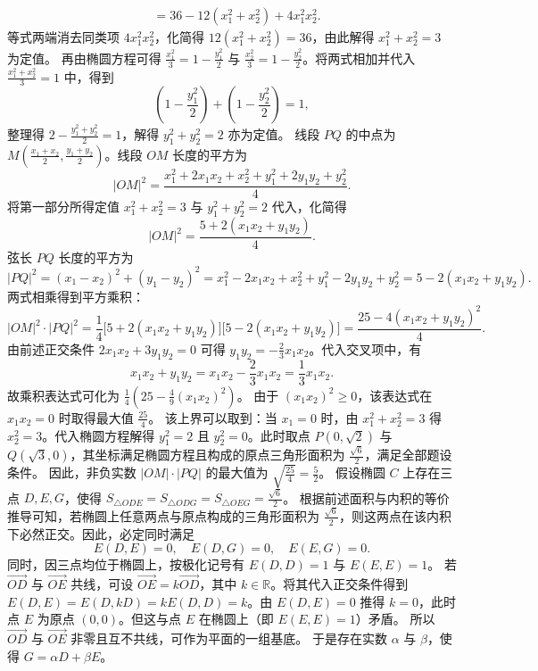 \begin{solution}
\begin{align*}
&= 36 - 12(x_1^2 + x_2^2) + 4x_1^2 x_2^2.
\end{align*}
等式两端消去同类项 $4x_1^2 x_2^2$，化简得 $12(x_1^2 + x_2^2) = 36$，由此解得 $x_1^2 + x_2^2 = 3$ 为定值。
再由椭圆方程可得 $\frac{x_1^2}{3} = 1 - \frac{y_1^2}{2}$ 与 $\frac{x_2^2}{3} = 1 - \frac{y_2^2}{2}$。将两式相加并代入 $\frac{x_1^2 + x_2^2}{3} = 1$ 中，得到
\[
\left( 1 - \frac{y_1^2}{2} \right) + \left( 1 - \frac{y_2^2}{2} \right) = 1,
\]
整理得 $2 - \frac{y_1^2 + y_2^2}{2} = 1$，解得 $y_1^2 + y_2^2 = 2$ 亦为定值。
线段 $PQ$ 的中点为 $M\left(\frac{x_1+x_2}{2}, \frac{y_1+y_2}{2}\right)$。线段 $OM$ 长度的平方为
\[
|OM|^2 = \frac{x_1^2 + 2x_1 x_2 + x_2^2 + y_1^2 + 2y_1 y_2 + y_2^2}{4}.
\]
将第一部分所得定值 $x_1^2 + x_2^2 = 3$ 与 $y_1^2 + y_2^2 = 2$ 代入，化简得
\[
|OM|^2 = \frac{5 + 2(x_1 x_2 + y_1 y_2)}{4}.
\]
弦长 $PQ$ 长度的平方为
\[
|PQ|^2 = (x_1 - x_2)^2 + (y_1 - y_2)^2 = x_1^2 - 2x_1 x_2 + x_2^2 + y_1^2 - 2y_1 y_2 + y_2^2 = 5 - 2(x_1 x_2 + y_1 y_2).
\]
两式相乘得到平方乘积：
\[
|OM|^2 \cdot |PQ|^2 = \frac{1}{4} \big[5 + 2(x_1 x_2 + y_1 y_2)\big] \big[5 - 2(x_1 x_2 + y_1 y_2)\big] = \frac{25 - 4(x_1 x_2 + y_1 y_2)^2}{4}.
\]
由前述正交条件 $2x_1 x_2 + 3y_1 y_2 = 0$ 可得 $y_1 y_2 = -\frac{2}{3} x_1 x_2$。代入交叉项中，有
\[
x_1 x_2 + y_1 y_2 = x_1 x_2 - \frac{2}{3} x_1 x_2 = \frac{1}{3} x_1 x_2.
\]
故乘积表达式可化为 $\frac{1}{4} \left( 25 - \frac{4}{9} (x_1 x_2)^2 \right)$。
由于 $(x_1 x_2)^2 \ge 0$，该表达式在 $x_1 x_2 = 0$ 时取得最大值 $\frac{25}{4}$。
该上界可以取到：当 $x_1 = 0$ 时，由 $x_1^2 + x_2^2 = 3$ 得 $x_2^2 = 3$。代入椭圆方程解得 $y_1^2 = 2$ 且 $y_2^2 = 0$。此时取点 $P(0, \sqrt{2})$ 与 $Q(\sqrt{3}, 0)$，其坐标满足椭圆方程且构成的原点三角形面积为 $\frac{\sqrt{6}}{2}$，满足全部题设条件。
因此，非负实数 $|OM| \cdot |PQ|$ 的最大值为 $\sqrt{\frac{25}{4}} = \frac{5}{2}$。
假设椭圆 $C$ 上存在三点 $D, E, G$，使得 $S_{\triangle ODE} = S_{\triangle ODG} = S_{\triangle OEG} = \frac{\sqrt{6}}{2}$。
根据前述面积与内积的等价推导可知，若椭圆上任意两点与原点构成的三角形面积为 $\frac{\sqrt{6}}{2}$，则这两点在该内积下必然正交。因此，必定同时满足
\[
E(D,E) = 0, \quad E(D,G) = 0, \quad E(E,G) = 0.
\]
同时，因三点均位于椭圆上，按极化记号有 $E(D,D) = 1$ 与 $E(E,E) = 1$。
若 $\overrightarrow{OD}$ 与 $\overrightarrow{OE}$ 共线，可设 $\overrightarrow{OE} = k\overrightarrow{OD}$，其中 $k \in \mathbb{R}$。将其代入正交条件得到 $E(D,E) = E(D, kD) = k E(D,D) = k$。由 $E(D,E) = 0$ 推得 $k = 0$，此时点 $E$ 为原点 $(0,0)$。但这与点 $E$ 在椭圆上（即 $E(E,E) = 1$）矛盾。
所以 $\overrightarrow{OD}$ 与 $\overrightarrow{OE}$ 非零且互不共线，可作为平面的一组基底。
于是存在实数 $\alpha$ 与 $\beta$，使得 $G = \alpha D + \beta E$。

\end{solution}
